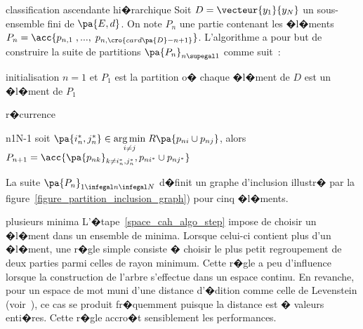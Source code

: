             \begin{xalgorithm}{classification ascendante hi�rarchique}\label{algorithm_AHC}%
            Soit $D= \vecteur{y_1}{y_N}$ un sous-ensemble fini de $\pa{E,d}$. On note $P_n$
            une partie contenant les �l�ments $P_n = \acc{p_{n,1} \; , ... , \; p_{n, \cro{card\pa{D}-n+1}}}$.
            L'algorithme a pour but de construire la suite de partitions $\pa{P_n}_{n \supegal 1}$ comme suit~:
            
            \begin{xalgostep}{initialisation}
                $n = 1$ et $P_1$ est la partition o� chaque �l�ment de $D$ est un �l�ment de $P_1$
            \end{xalgostep}
            
            \begin{xalgostep}{r�currence}\label{space_cah_algo_step}
                \begin{xfor}{n}{1}{N-1}
                    soit $\pa{i^*_n,j^*_n} \in \underset{ i \neq j }{\arg \min} \; R\pa{p_{ni} \cup p_{nj} }$, alors
                    $P_{n+1} = \acc{ \pa{p_{nk}}_{k \neq i^*_n,j^*_n}, p_{ni^*} \cup p_{nj^*} }$
                \end{xfor}
            \end{xalgostep}
            
            \end{xalgorithm}



La suite $\pa{P_n}_{1 \infegal n \infegal N}$ d�finit un graphe d'inclusion illustr� par la
figure~\ref{figure_partition_inclusion_graph}) pour cinq �l�ments.\\









\begin{xremark}{plusieurs minima}
L'�tape~\ref{space_cah_algo_step} impose de choisir un �l�ment dans un ensemble de minima. Lorsque celui-ci contient plus d'un �l�ment, une r�gle simple consiste � choisir le plus petit regroupement de deux parties parmi celles de rayon minimum. Cette r�gle a peu d'influence lorsque la construction de l'arbre s'effectue dans un espace continu. En revanche, pour un espace de mot muni d'une distance d'�dition comme celle de Levenstein (voir~), ce cas se produit fr�quemment puisque la distance est � valeurs enti�res. Cette r�gle accro�t sensiblement les performances.
\end{xremark}



